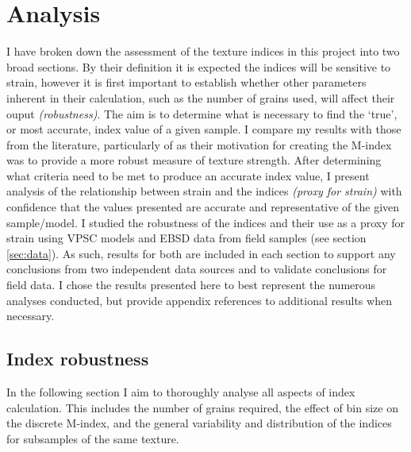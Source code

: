 \documentclass[a4paper,12pt]{report}
\numberwithin{equation}{chapter}
\begin{document}
\chapter{Analysis} \label{chap:analysis}
\vspace{-1cm}
I have broken down the assessment of the texture indices in this project into two broad sections. By their definition it is expected the indices will be sensitive to strain, however it is first important to establish whether other parameters inherent in their calculation, such as the number of grains used, will affect their ouput \emph{(robustness)}. The aim is to determine what is necessary to find the \lq{}true\rq{}, or most accurate, index value of a given sample. I compare my results with those from the literature, particularly of \cite{Skemer} as their motivation for creating the M-index was to provide a more robust measure of texture strength. After determining what criteria need to be met to produce an accurate index value, I present analysis of the relationship between strain and the indices \emph{(proxy for strain)} with confidence that the values presented are accurate and representative of the given sample/model. I studied the robustness of the indices and their use as a proxy for strain using VPSC models and EBSD data from field samples (see section \ref{sec:data}). As such, results for both are included in each section to support any conclusions from two independent data sources and to validate conclusions for field data. I chose the results presented here to best represent the numerous analyses conducted, but provide appendix references to additional results when necessary.       


\section{Index robustness}
In the following section I aim to thoroughly analyse all aspects of index calculation. This includes the number of grains required, the effect of bin size on the discrete M-index, and the general variability and distribution of the indices for subsamples of the same texture. 
\end{document}
